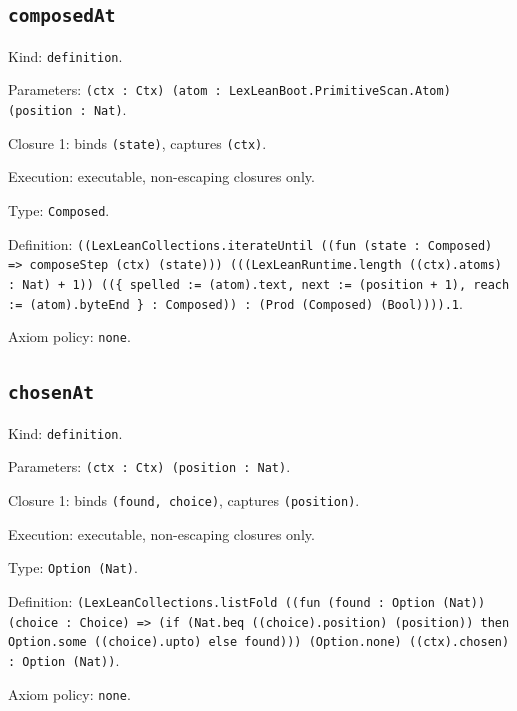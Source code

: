 \documentclass[11pt]{article}
\begin{document}
\subsection*{\texttt{composedAt}}
\noindent Kind: \texttt{definition}.\par
\noindent Parameters: \texttt{(ctx : Ctx) (atom : LexLeanBoot.PrimitiveScan.Atom) (position : Nat)}.\par
\noindent Closure 1: binds \texttt{(state)}, captures \texttt{(ctx)}.\par
\noindent Execution: executable, non-escaping closures only.\par
\noindent Type: \texttt{Composed}.\par
\noindent Definition: \texttt{((LexLeanCollections.iterateUntil ((fun (state : Composed) => composeStep (ctx) (state))) (((LexLeanRuntime.length ((ctx).atoms) : Nat) + 1)) ((\{ spelled := (atom).text, next := (position + 1), reach := (atom).byteEnd \} : Composed)) : (Prod (Composed) (Bool)))).1}.\par
\noindent Axiom policy: \texttt{none}.\par
\subsection*{\texttt{chosenAt}}
\noindent Kind: \texttt{definition}.\par
\noindent Parameters: \texttt{(ctx : Ctx) (position : Nat)}.\par
\noindent Closure 1: binds \texttt{(found, choice)}, captures \texttt{(position)}.\par
\noindent Execution: executable, non-escaping closures only.\par
\noindent Type: \texttt{Option (Nat)}.\par
\noindent Definition: \texttt{(LexLeanCollections.listFold ((fun (found : Option (Nat)) (choice : Choice) => (if (Nat.beq ((choice).position) (position)) then Option.some ((choice).upto) else found))) (Option.none) ((ctx).chosen) : Option (Nat))}.\par
\noindent Axiom policy: \texttt{none}.\par
\end{document}
